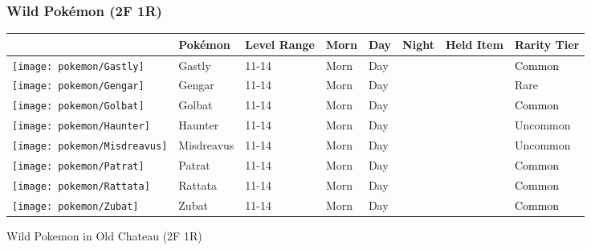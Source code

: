 \subsubsection{Wild Pokémon (2F 1R)}%
\label{ssubsec:WildPokmon(2F1R)}%
\begin{longtable}{||l l l l l l l l||}%
\hline%
\rowcolor{gray}%
&Pokémon&Level Range&Morn&Day&Night&Held Item&Rarity Tier\\%
\hline%
\endhead%
\hline%
\rowcolor{gray}%
\texttt{[image: pokemon/Gastly]}&Gastly&11{-}14&Morn&Day&&&\textcolor{black}{%
Common%
}\\%
\hline%
\rowcolor{gray}%
\texttt{[image: pokemon/Gengar]}&Gengar&11{-}14&Morn&Day&&&\textcolor{RedOrange}{%
Rare%
}\\%
\hline%
\rowcolor{gray}%
\texttt{[image: pokemon/Golbat]}&Golbat&11{-}14&Morn&Day&&&\textcolor{black}{%
Common%
}\\%
\hline%
\rowcolor{gray}%
\texttt{[image: pokemon/Haunter]}&Haunter&11{-}14&Morn&Day&&&\textcolor{OliveGreen}{%
Uncommon%
}\\%
\hline%
\rowcolor{gray}%
\texttt{[image: pokemon/Misdreavus]}&Misdreavus&11{-}14&Morn&Day&&&\textcolor{OliveGreen}{%
Uncommon%
}\\%
\hline%
\rowcolor{gray}%
\texttt{[image: pokemon/Patrat]}&Patrat&11{-}14&Morn&Day&&&\textcolor{black}{%
Common%
}\\%
\hline%
\rowcolor{gray}%
\texttt{[image: pokemon/Rattata]}&Rattata&11{-}14&Morn&Day&&&\textcolor{black}{%
Common%
}\\%
\hline%
\rowcolor{gray}%
\texttt{[image: pokemon/Zubat]}&Zubat&11{-}14&Morn&Day&&&\textcolor{black}{%
Common%
}\\%
\hline%
\end{longtable}%
\caption{Wild Pokemon in Old Chateau (2F 1R)}